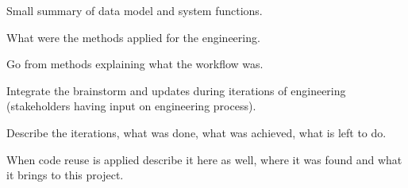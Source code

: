 Small summary of data model and system functions.

What were the methods applied for the engineering.

Go from methods explaining what the workflow was.

	Integrate the brainstorm and updates during iterations of engineering (stakeholders having input on engineering process).

Describe the iterations, what was done, what was achieved, what is left to do.

	When code reuse is applied describe it here as well, where it was found and what it brings to this project.